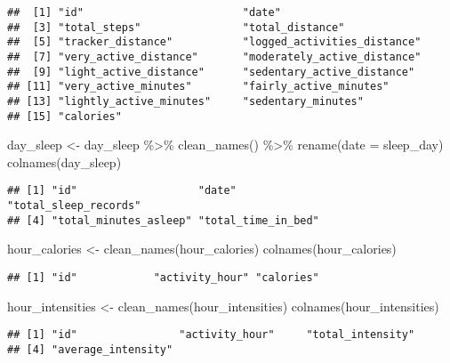 \documentclass[
]{article}
\newenvironment{Shaded}{\begin{snugshade}}{\end{snugshade}}
\newcommand{\AttributeTok}[1]{\textcolor[rgb]{0.77,0.63,0.00}{#1}}
\newcommand{\FunctionTok}[1]{\textcolor[rgb]{0.00,0.00,0.00}{#1}}
\newcommand{\NormalTok}[1]{#1}
\newcommand{\OtherTok}[1]{\textcolor[rgb]{0.56,0.35,0.01}{#1}}
\newcommand{\SpecialCharTok}[1]{\textcolor[rgb]{0.00,0.00,0.00}{#1}}
\begin{document}
\begin{verbatim}
##  [1] "id"                         "date"                      
##  [3] "total_steps"                "total_distance"            
##  [5] "tracker_distance"           "logged_activities_distance"
##  [7] "very_active_distance"       "moderately_active_distance"
##  [9] "light_active_distance"      "sedentary_active_distance" 
## [11] "very_active_minutes"        "fairly_active_minutes"     
## [13] "lightly_active_minutes"     "sedentary_minutes"         
## [15] "calories"
\end{verbatim}

\begin{Shaded}
\begin{Highlighting}[]
\NormalTok{day\_sleep }\OtherTok{\textless{}{-}}\NormalTok{ day\_sleep }\SpecialCharTok{\%\textgreater{}\%}
  \FunctionTok{clean\_names}\NormalTok{() }\SpecialCharTok{\%\textgreater{}\%}
  \FunctionTok{rename}\NormalTok{(}\AttributeTok{date =}\NormalTok{ sleep\_day)}
\FunctionTok{colnames}\NormalTok{(day\_sleep)}
\end{Highlighting}
\end{Shaded}

\begin{verbatim}
## [1] "id"                   "date"                 "total_sleep_records" 
## [4] "total_minutes_asleep" "total_time_in_bed"
\end{verbatim}

\begin{Shaded}
\begin{Highlighting}[]
\NormalTok{hour\_calories }\OtherTok{\textless{}{-}} \FunctionTok{clean\_names}\NormalTok{(hour\_calories)}
\FunctionTok{colnames}\NormalTok{(hour\_calories)}
\end{Highlighting}
\end{Shaded}

\begin{verbatim}
## [1] "id"            "activity_hour" "calories"
\end{verbatim}

\begin{Shaded}
\begin{Highlighting}[]
\NormalTok{hour\_intensities }\OtherTok{\textless{}{-}} \FunctionTok{clean\_names}\NormalTok{(hour\_intensities)}
\FunctionTok{colnames}\NormalTok{(hour\_intensities)}
\end{Highlighting}
\end{Shaded}

\begin{verbatim}
## [1] "id"                "activity_hour"     "total_intensity"  
## [4] "average_intensity"
\end{verbatim}
\end{document}

